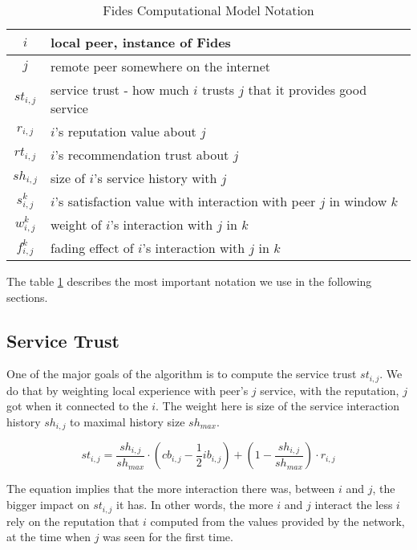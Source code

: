 \begin{table}[ht]
\centering
\begin{tabular}{ c | m{20em} }
 $i$ & local peer, instance of Fides \\
 \hline
 $j$ & remote peer somewhere on the internet \\
 \hline
 $st_{i, j}$ & service trust - how much $i$ trusts $j$ that it provides good service \\
 \hline
 $r_{i, j}$ & $i$'s reputation value about $j$ \\
 \hline
 $rt_{i, j}$ & $i$'s recommendation trust about $j$ \\
 \hline
 $sh_{i, j}$ & size of $i$'s service history with $j$ \\
 \hline
 $s^{k}_{i, j}$ & $i$'s satisfaction value with interaction with peer $j$ in window $k$\\
 \hline
 $w^{k}_{i, j}$ & weight of $i$'s interaction with $j$ in $k$ \\
 \hline
 $f^{k}_{i, j}$ & fading effect of $i$'s interaction with $j$ in $k$ \\
\end{tabular}
\caption{Fides Computational Model Notation}
\label{tab:notation-computational-model}
\end{table}

\vspace{5mm}

\noindent 
The table \ref{tab:notation-computational-model} describes the most important notation we use in the following sections.

\subsection{Service Trust}
\label{subsec:service-trust}
One of the major goals of the algorithm is to compute the service trust $st_{i,j}$.
We do that by weighting local experience with peer's $j$ service, with the reputation, $j$ got when it connected to the $i$. The weight here is size of the service interaction history $sh_{i,j}$ to maximal history size $sh_{max}$.

\begin{equation}\label{eq:service-trust}
st_{i,j}=\frac{sh_{i,j}}{sh_{max}} \cdot \left(cb_{i,j} - \frac{1}{2} ib_{i,j} \right) +\left(1-\frac{sh_{i,j}}{sh_{max}}\right) \cdot r_{i,j}
\end{equation}

The equation implies that the more interaction there was, between $i$ and $j$, the bigger impact on $st_{i,j}$ it has. 
In other words, the more $i$ and $j$ interact the less $i$ rely on the reputation that $i$ computed from the values provided by the network, at the time when $j$ was seen for the first time.

